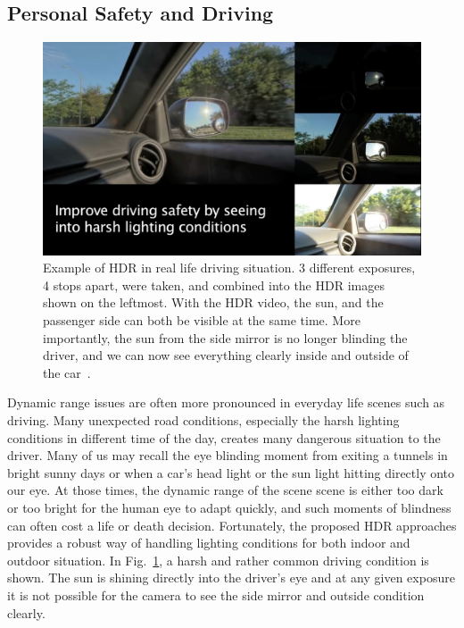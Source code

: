 \subsection{Personal Safety and Driving}
\begin{figure}
\center
 \includegraphics[width=5.5in]{ch2/diagrams/everyday3.jpg}
 \caption{Example of HDR in real life driving situation. 3 different exposures, 4 stops apart, were 
taken, and combined into the HDR images shown on the leftmost. With the HDR video, the sun, and 
the passenger side can both be visible at the same time. More importantly, the sun from the side 
mirror is no longer blinding the driver, and we can now see everything clearly inside and outside of 
the car~\cite{mann2012hdrchitecture}.}
 \label{fig:extremeeveryday3}
\end{figure}
Dynamic range issues are often more pronounced in everyday life scenes such as driving. Many 
unexpected road conditions, especially the harsh lighting conditions in different time of the day, 
creates many dangerous situation to the driver. Many of us may recall the eye blinding moment from 
exiting a tunnels in bright sunny days or when a car's head light or the sun light hitting directly onto 
our eye.  At those times, the dynamic range of the scene scene is either too dark or too bright for the 
human eye to adapt quickly, and such moments of blindness can often cost a life or death decision. 
Fortunately, the proposed HDR approaches provides a robust way of handling lighting conditions for 
both indoor and outdoor situation. In Fig.~\ref{fig:extremeeveryday3}, a harsh and rather common 
driving condition is shown. The sun is shining directly into the driver's eye and at any given exposure 
it is not possible for the camera to see the side mirror and outside condition clearly.

